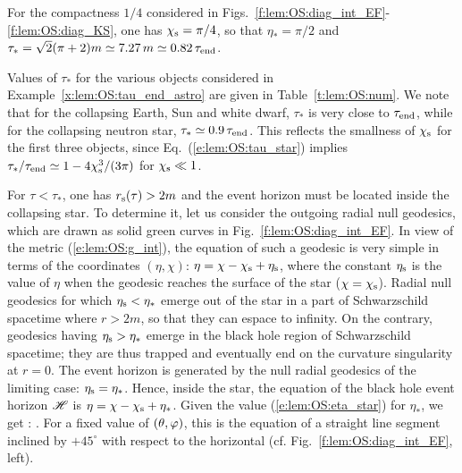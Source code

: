 \begin{example} \label{x:lem:OS:tau_star_chis4}
For the compactness $1/4$ considered in
Figs.~\ref{f:lem:OS:diag_int_EF}-\ref{f:lem:OS:diag_KS}, one has $\chi_{\rm s}=\pi/4$,
so that $\eta_* = \pi/2$ and
$\tau_* = \sqrt{2}(\pi + 2) m \simeq 7.27 \, m \simeq 0.82 \, \tau_{\rm end}$.
\end{example}

\begin{example} \label{x:lem:OS:tau_star_astro}
Values of $\tau_*$ for the various objects considered in Example~\ref{x:lem:OS:tau_end_astro}
are given in Table~\ref{t:lem:OS:num}. We note that for the collapsing Earth, Sun and white dwarf,
$\tau_*$ is very close to $\tau_{\rm end}$, while for the collapsing neutron star,
$\tau_* \simeq 0.9 \, \tau_{\rm end}$. This reflects the smallness of $\chi_{\rm s}$ for
the first three objects, since Eq.~(\ref{e:lem:OS:tau_star}) implies
$\tau_*/\tau_{\rm end} \simeq 1 - 4 \chi_{\rm s}^3/(3\pi)$ for $\chi_{\rm s} \ll 1$.
\end{example}

For $\tau < \tau_*$, one has $r_{\rm s}(\tau) > 2 m$ and the event horizon
must be located inside the collapsing star. To determine it,
let us consider the outgoing radial null geodesics, which are drawn as solid green curves
in Fig.~\ref{f:lem:OS:diag_int_EF}. In view of the metric (\ref{e:lem:OS:g_int}),
the equation of such a geodesic is very simple in terms of
the coordinates $(\eta,\chi)$: $\eta = \chi - \chi_{\rm s} + \eta_{\rm s}$, where
the constant $\eta_{\rm s}$ is the value of $\eta$ when the geodesic
reaches the surface of the star ($\chi = \chi_{\rm s}$). Radial null geodesics
for which $\eta_{\rm s} < \eta_*$ emerge out of the star in
a part of Schwarzschild spacetime where $r > 2 m$, so that they can espace
to infinity. On the contrary, geodesics having $\eta_{\rm s} > \eta_*$ emerge in the
black hole region of Schwarzschild spacetime; they are thus trapped and
eventually end on the curvature singularity at $r=0$. The event horizon
is generated by the null radial geodesics of the limiting case: $\eta_{\rm s} = \eta_*$.
Hence, inside the star, the equation of the black hole event horizon $\mathscr{H}$
is $\eta = \chi - \chi_{\rm s} + \eta_*$. Given the value (\ref{e:lem:OS:eta_star}) for
$\eta_*$, we get
\be \label{e:lem:OS:Hor_eta_chi}
    \Hor:\quad {} .
\ee
For a fixed value of $(\theta,\varphi)$, this is the equation of a straight line segment
inclined by $+45^\circ$ with
respect to the horizontal (cf. Fig.~\ref{f:lem:OS:diag_int_EF}, left).

